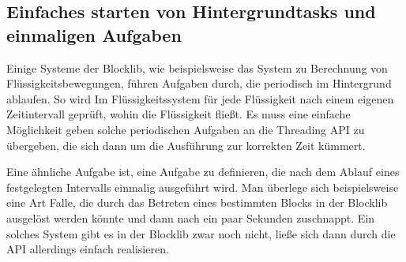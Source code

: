 \subsection{Einfaches starten von Hintergrundtasks und einmaligen Aufgaben}
Einige Systeme der Blocklib, wie beispielsweise das System zu Berechnung von Flüssigkeitsbewegungen, führen Aufgaben durch, die periodisch im Hintergrund ablaufen. So wird Im Flüssigkeitssystem für jede Flüssigkeit nach einem eigenen Zeitintervall geprüft, wohin die Flüssigkeit fließt. Es muss eine einfache Möglichkeit geben solche periodischen Aufgaben an die Threading API zu übergeben, die sich dann um die Ausführung zur korrekten Zeit kümmert.

Eine ähnliche Aufgabe ist, eine Aufgabe zu definieren, die nach dem Ablauf eines festgelegten Intervalls einmalig ausgeführt wird. Man überlege sich beispielsweise eine Art Falle, die durch das Betreten eines bestimmten Blocks in der Blocklib ausgelöst werden könnte und dann nach ein paar Sekunden zuschnappt. Ein solches System gibt es in der Blocklib zwar noch nicht, ließe sich dann durch die API allerdings einfach realisieren.
